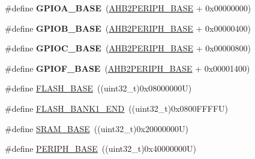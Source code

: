 \begin{DoxyCompactItemize}
\item 
\mbox{\label{group___peripheral__memory__map_gad7723846cc5db8e43a44d78cf21f6efa}} 
\#define {\bfseries G\+P\+I\+O\+A\+\_\+\+B\+A\+SE}~(\hyperlink{group___peripheral__memory__map_gaeedaa71d22a1948492365e2cd26cfd46}{A\+H\+B2\+P\+E\+R\+I\+P\+H\+\_\+\+B\+A\+SE} + 0x00000000)
\item 
\mbox{\label{group___peripheral__memory__map_gac944a89eb789000ece920c0f89cb6a68}} 
\#define {\bfseries G\+P\+I\+O\+B\+\_\+\+B\+A\+SE}~(\hyperlink{group___peripheral__memory__map_gaeedaa71d22a1948492365e2cd26cfd46}{A\+H\+B2\+P\+E\+R\+I\+P\+H\+\_\+\+B\+A\+SE} + 0x00000400)
\item 
\mbox{\label{group___peripheral__memory__map_ga26f267dc35338eef219544c51f1e6b3f}} 
\#define {\bfseries G\+P\+I\+O\+C\+\_\+\+B\+A\+SE}~(\hyperlink{group___peripheral__memory__map_gaeedaa71d22a1948492365e2cd26cfd46}{A\+H\+B2\+P\+E\+R\+I\+P\+H\+\_\+\+B\+A\+SE} + 0x00000800)
\item 
\mbox{\label{group___peripheral__memory__map_ga7f9a3f4223a1a784af464a114978d26e}} 
\#define {\bfseries G\+P\+I\+O\+F\+\_\+\+B\+A\+SE}~(\hyperlink{group___peripheral__memory__map_gaeedaa71d22a1948492365e2cd26cfd46}{A\+H\+B2\+P\+E\+R\+I\+P\+H\+\_\+\+B\+A\+SE} + 0x00001400)
\item 
\#define \hyperlink{group___peripheral__memory__map_ga23a9099a5f8fc9c6e253c0eecb2be8db}{F\+L\+A\+S\+H\+\_\+\+B\+A\+SE}~((uint32\+\_\+t)0x08000000\+U)
\item 
\#define \hyperlink{group___peripheral__memory__map_ga443a2786535d83e32dfdc2b29e379332}{F\+L\+A\+S\+H\+\_\+\+B\+A\+N\+K1\+\_\+\+E\+ND}~((uint32\+\_\+t)0x0800\+F\+F\+F\+F\+U)
\item 
\#define \hyperlink{group___peripheral__memory__map_ga05e8f3d2e5868754a7cd88614955aecc}{S\+R\+A\+M\+\_\+\+B\+A\+SE}~((uint32\+\_\+t)0x20000000\+U)
\item 
\#define \hyperlink{group___peripheral__memory__map_ga9171f49478fa86d932f89e78e73b88b0}{P\+E\+R\+I\+P\+H\+\_\+\+B\+A\+SE}~((uint32\+\_\+t)0x40000000\+U)
\item 
\mbox{\label{group___peripheral__memory__map_gac85f31889eb6a3f651b563bbc7131f91}} 

\end{DoxyCompactItemize}
